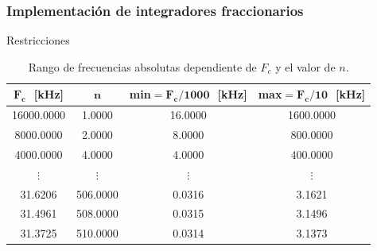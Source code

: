 \documentclass[10pt]{beamer}
\begin{document}
	\begin{frame}
		\frametitle{Implementación de integradores fraccionarios}
		\begin{block}{Restricciones}
		\begin{footnotesize}
		\begin{table}[!hbp]                                      
		\centering   
		\caption{Rango de frecuencias absolutas dependiente de $F_{c}$ y el valor de $n$.}                            
		\label{tab:frecuencias_absolutas}                                        
			\begin{tabular}{cccc}                        
			\hline                                              
			$\bm{F_{c}}\,\,$ [kHz] & $\bm{n}$ & \textbf{min}$\bm{=F_{c} / 1000}\,\,$ [kHz] & \textbf{max}$\bm{=F_{c} /10}\,\,$ [kHz] \\                    
			\hline                                              
			16000.0000 & 1.0000 & 16.0000 & 1600.0000 \\
			                                     
			8000.0000 & 2.0000 & 8.0000 & 800.0000 \\   
			                                     
			4000.0000 & 4.0000 & 4.0000 & 400.0000 \\   
			
			$\vdots$ & $\vdots$ & $\vdots$ & $\vdots$ \\  
			 
			31.6206 & 506.0000 & 0.0316 & 3.1621 \\     
			                                    
			31.4961 & 508.0000 & 0.0315 & 3.1496 \\     
			                                    
			31.3725 & 510.0000 & 0.0314 & 3.1373 \\      
			\hline                                           
			\end{tabular}                                                                
	\end{table} 
		\end{footnotesize}
		\end{block}
	\end{frame}
\end{document}
